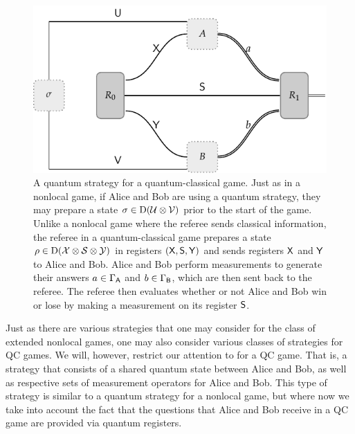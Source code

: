 \begin{figure}[!htpb] 
	\begin{center}
		\includegraphics[scale=1.0]{figures/quantum_classical_game.pdf}
	\end{center}
		\caption[A quantum strategy for a quantum-classical game.]{A quantum strategy for a quantum-classical game. Just as in a nonlocal game, if Alice and Bob are using a quantum strategy, they may prepare a state $\sigma \in \mathrm{D}(\mathcal{U} \otimes \mathcal{V})$ prior to the start of the game. Unlike a nonlocal game where the referee sends classical information, the referee in a quantum-classical game prepares a state $\rho \in \mathrm{D}(\mathcal{X} \otimes \mathcal{S} \otimes \mathcal{Y})$ in registers $(\mathsf{X},\mathsf{S},\mathsf{Y})$ and sends registers $\mathsf{X}$ and $\mathsf{Y}$ to Alice and Bob. Alice and Bob perform measurements to generate their answers $a \in \Gamma_{\mathsf{A}}$ and $b \in \Gamma_{\mathsf{B}}$, which are then sent back to the referee. The referee then evaluates whether or not Alice and Bob win or lose by making a measurement on its register $\mathsf{S}$.}
		\label{fig:quantum-classical-game}
\end{figure}

Just as there are various strategies that one may consider for the class of extended nonlocal games, one may also consider various classes of strategies for QC games. We will, however, restrict our attention to  for a QC game. That is, a strategy that consists of a shared quantum state between Alice and Bob, as well as respective sets of measurement operators for Alice and Bob. This type of strategy is similar to a quantum strategy for a nonlocal game, but where now we take into account the fact that the questions that Alice and Bob receive in a QC game are provided via quantum registers. 

